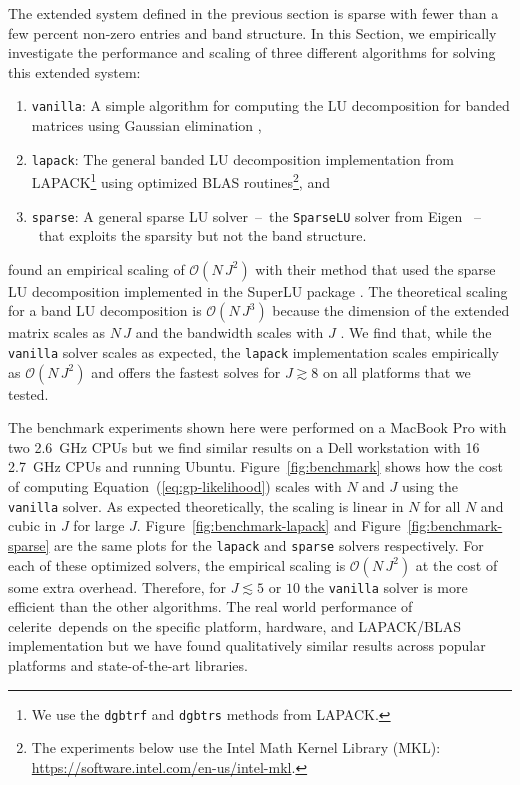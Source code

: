 \documentclass[manuscript, letterpaper]{aastex6}
\newcommand{\project}[1]{\textsf{#1}}
\newcommand{\celerite}{\project{celerite}}
\newcommand{\figureref}[1]{\ref{fig:#1}}
\newcommand{\Figure}[1]{Figure~\figureref{#1}}
\renewcommand{\eqref}[1]{\ref{eq:#1}}
\newcommand{\Eq}[1]{Equation~(\eqref{#1})}
\newcommand{\eq}[1]{\Eq{#1}}
\newcommand{\sectionname}{Section}
\begin{document}
The extended system defined in the previous section is sparse with fewer than
a few percent non-zero entries and band structure.
In this \sectionname, we empirically investigate the performance and scaling
of three different algorithms for solving this extended system:

\begin{enumerate}

\item \texttt{vanilla}: A simple algorithm for computing the LU decomposition
    for banded matrices using Gaussian elimination \citep{Press:1992,
    Press:2007},

\item \texttt{lapack}: The general banded LU decomposition implementation from
    LAPACK\footnote{We use the \texttt{dgbtrf} and \texttt{dgbtrs} methods
    from LAPACK.} \citep{Anderson:1999} using optimized BLAS
    routines\footnote{The experiments below use the Intel Math Kernel Library
    (\project{MKL}): \url{https://software.intel.com/en-us/intel-mkl}.}, and

\item \texttt{sparse}: A general sparse LU solver~--~the \texttt{SparseLU}
    solver from \project{Eigen} \citep{Guennebaud:2010}~--~that exploits the
    sparsity but not the band structure.

\end{enumerate}

\citet{Ambikasaran:2015} found an empirical scaling of $\mathcal{O}(N\,J^2)$
with their method that used the sparse LU decomposition implemented in the
\project{SuperLU} package \citep{Demmel:1999}.
The theoretical scaling for a band LU decomposition is $\mathcal{O}(N\,J^3)$
because the dimension of the extended matrix scales as $N\,J$ and the
bandwidth scales with $J$ \citep{Press:1992, Press:2007}.
We find that, while the \texttt{vanilla} solver scales as expected, the
\texttt{lapack} implementation scales empirically as $\mathcal{O}(N\,J^2)$ and
offers the fastest solves for $J \gtrsim 8$ on all platforms that we tested.

The benchmark experiments shown here were performed on a MacBook Pro with two
2.6~GHz CPUs but we find similar results on a Dell workstation with 16 2.7~GHz
CPUs and running Ubuntu.
\Figure{benchmark} shows how the cost of computing \eq{gp-likelihood} scales
with $N$ and $J$ using the \texttt{vanilla} solver.
As expected theoretically, the scaling is linear in $N$ for all $N$ and cubic
in $J$ for large $J$.
\Figure{benchmark-lapack} and \Figure{benchmark-sparse} are the same plots for
the \texttt{lapack} and \texttt{sparse} solvers respectively.
For each of these optimized solvers, the empirical scaling is
$\mathcal{O}(N\,J^2)$ at the cost of some extra overhead.
Therefore, for $J \lesssim 5$ or $10$ the \texttt{vanilla} solver is more
efficient than the other algorithms.
The real world performance of \celerite\ depends on the specific platform,
hardware, and \project{LAPACK}/\project{BLAS} implementation but we have found
qualitatively similar results across popular platforms and state-of-the-art
libraries.
\end{document}
